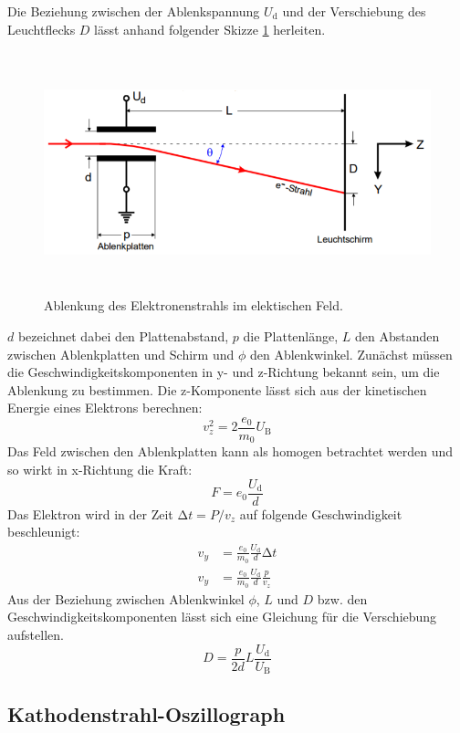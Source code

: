 Die Beziehung zwischen der Ablenkspannung $U_\text{d}$ und der Verschiebung des Leuchtflecks $D$ lässt anhand folgender Skizze \ref{fig:Ablenkung} herleiten.
\begin{figure}
  \centering
  \includegraphics[height=7cm]{data/elekAblenkung.png}
  \caption{Ablenkung des Elektronenstrahls im elektischen Feld.}
  \label{fig:Ablenkung}
\end{figure}
$d$ bezeichnet dabei den Plattenabstand, $p$ die Plattenlänge, $L$ den Abstanden zwischen Ablenkplatten und Schirm und $\phi$ den Ablenkwinkel.
Zunächst müssen die Geschwindigkeitskomponenten in y- und z-Richtung bekannt sein, um die Ablenkung zu bestimmen.
Die z-Komponente lässt sich aus der kinetischen Energie eines Elektrons berechnen:
\begin{equation}
  v_z^2 = 2 \frac{e_0}{m_0} U_\text{B}
\end{equation}
Das Feld zwischen den Ablenkplatten kann als homogen betrachtet werden und so wirkt in x-Richtung die Kraft:
\begin{equation}
  F = e_0 \frac{U_\text{d}}{d}
\end{equation}
Das Elektron wird in der Zeit $\increment t = P / v_z$ auf folgende Geschwindigkeit beschleunigt:
\begin{align}
  v_y & = \frac{e_0}{m_0} \frac{U_\text{d}}{d} \increment t \\
  v_y & = \frac{e_0}{m_0} \frac{U_\text{d}}{d} \frac{p}{v_z}
\end{align}
Aus der Beziehung zwischen Ablenkwinkel $\phi$, $L$ und $D$ bzw. den Geschwindigkeitskomponenten lässt sich eine Gleichung für die Verschiebung aufstellen.
\begin{equation}
  D = \frac{p}{2d} L \frac{U_\text{d}}{U_\text{B}}
\end{equation}

\subsection{Kathodenstrahl-Oszillograph}
\label{sec:Oszillograph}

